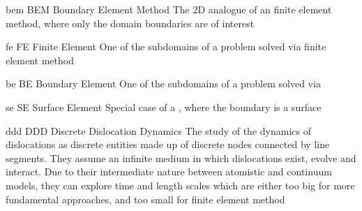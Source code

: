\newdualentry
{bem}
{BEM}
{Boundary Element Method}
{The 2D analogue of an finite element method, where only the domain boundaries are of interest}

\newdualentry
{fe}
{FE}
{Finite Element}
{One of the subdomains of a problem solved via finite element method}

\newdualentry
{be}
{BE}
{Boundary Element}
{One of the subdomains of a problem solved via }

\newdualentry
{se}
{SE}
{Surface Element}
{Special case of a , where the boundary is a surface}

\newdualentry
{ddd}
{DDD}
{Discrete Dislocation Dynamics}
{The study of the dynamics of dislocations as discrete entities made up of discrete nodes connected by line segments. They assume an infinite medium in which dislocations exist, evolve and interact. Due to their intermediate nature between atomistic and continuum models, they can explore time and length scales which are either too big for more fundamental approaches, and too small for finite element method}